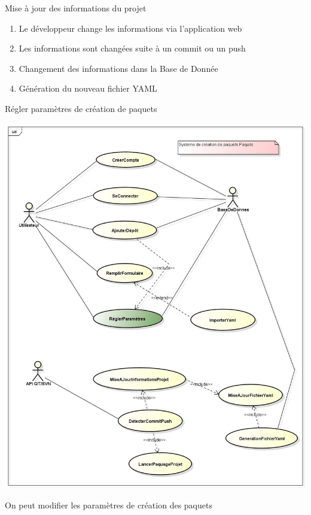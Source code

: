 \documentclass[9pt,xcolor=dvipsnames]{beamer}
\begin{document}
\begin{frame}{Mise à jour des informations du projet}
\begin{minipage}{0.5\textwidth}
\begin{flushright}
\begin{itemize}
        \begin{enumerate}
        \item Le développeur change les informations via l'application web
        \item Les informations sont changées suite à un commit ou un push
        \item Changement des informations dans la Base de Donnée
        \item Génération du nouveau fichier YAML
        \end{enumerate}
      \end{itemize}
    \end{flushright}
  \end{minipage}
\end{frame}

\begin{frame}{Régler paramètres de création de paquets}
  \begin{minipage}{0.40\textwidth}
    \begin{flushleft}
      \includegraphics[scale=\largeur]{../img/Diagram_reglerParametre.jpg}
    \end{flushleft}
  \end{minipage}
  \hfill
  \begin{minipage}{0.5\textwidth}
    \begin{flushright}
      On peut modifier les paramètres de création des paquets
    \end{flushright}
  \end{minipage}
\end{frame}
\end{document}
